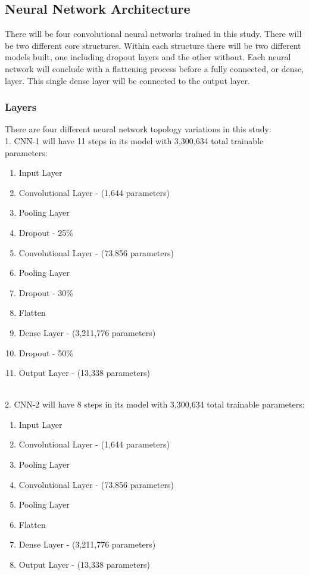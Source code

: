 \documentclass[5p,authoryear]{elsarticle}
\begin{document}
\subsection{Neural Network Architecture}

There will be four convolutional neural networks trained in this study. There will be two different core structures. Within each structure there will be two different models built, one including dropout layers and the other without. Each neural network will conclude with a flattening process before a fully connected, or dense, layer. This single dense layer will be connected to the output layer. 

\subsubsection{Layers}

There are four different neural network topology variations in this study: \\


1.	CNN-1 will have 11 steps in its model with 3,300,634 total trainable parameters:

\begin{enumerate}
 \item Input Layer
 \item Convolutional Layer - (1,644 parameters)
 \item Pooling Layer
 \item Dropout - 25\%
 \item Convolutional Layer - (73,856 parameters)
 \item Pooling Layer
 \item Dropout - 30\%
 \item Flatten
 \item Dense Layer - (3,211,776 parameters)
 \item Dropout - 50\%
 \item Output Layer - (13,338 parameters)
\end{enumerate} \\



2.	CNN-2 will have 8 steps in its model with 3,300,634 total trainable parameters: 

\begin{enumerate}
 \item Input Layer
 \item Convolutional Layer - (1,644 parameters)
 \item Pooling Layer
 \item Convolutional Layer - (73,856 parameters)
 \item Pooling Layer
 \item Flatten
 \item Dense Layer - (3,211,776 parameters)
 \item Output Layer - (13,338 parameters)
\end{enumerate} \\
\end{document}
